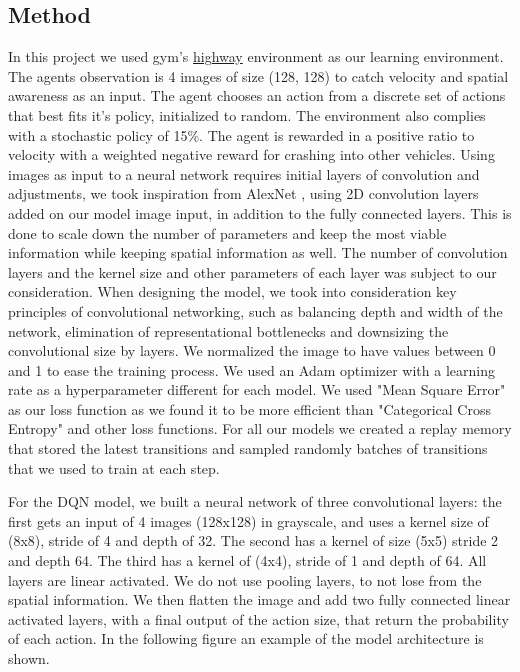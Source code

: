 \documentclass[leqno]{article}
\begin{document}
\begin{multicols}{2}
\section{Method}
In this project we used gym's \href{https://highway-env.readthedocs.io/en/latest/index.html}{highway} environment as our learning environment. The agents observation is 4 images of size (128, 128) to catch velocity and spatial awareness as an input. The agent chooses an action from a discrete set of actions that best fits it's policy, initialized to random. The environment also complies with a stochastic policy of 15\%. The agent is rewarded in a positive ratio to velocity with a weighted negative reward for crashing into other vehicles. Using images as input to a neural network requires initial layers of convolution and adjustments, we took inspiration from AlexNet \cite{alexnet}, using 2D convolution layers added on our model image input, in addition to the fully connected layers. This is done to scale down the number of parameters and keep the most viable information while keeping spatial information as well. The number of convolution layers and the kernel size and other parameters of each layer was subject to our consideration. When designing the model, we took into consideration key principles of convolutional networking, such as balancing depth and width of the network, elimination of representational bottlenecks and downsizing the convolutional size by layers. We normalized the image to have values between 0 and 1 to ease the training process. We used an Adam optimizer with a learning rate as a hyperparameter different for each model. We used "Mean Square Error" as our loss function as we found it to be more efficient than "Categorical Cross Entropy" and other loss functions. For all our models we created a replay memory that stored the latest transitions and sampled randomly batches of transitions that we used to train at each step.

For the DQN model, we built a neural network of three convolutional layers: the first gets an input of 4 images (128x128) in grayscale, and uses a kernel size of (8x8), stride of 4 and depth of 32. The second has a kernel of size (5x5) stride 2 and depth 64. The third has a kernel of (4x4), stride of 1 and depth of 64. All layers are linear activated. We do not use pooling layers, to not lose from the spatial information. We then flatten the image and add two fully connected linear activated layers, with a final output of the action size, that return the probability of each action. In the following figure an example of the model architecture is shown.


\end{multicols}
\end{document}

